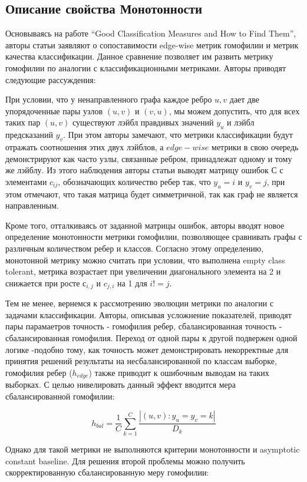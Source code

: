 \documentclass[a4paper,14pt]{article}
\begin{document}
	
	\subsection{Описание свойства Монотонности}
	
	Основываясь на работе “Good Classification Measures and How to Find Them”, авторы статьи заявляют о сопоставимости edge-wise метрик гомофилии и метрик качества классификации.
	Данное сравнение позволяет им развить метрику гомофилии по аналогии с классификационными метриками. Авторы приводят следующие рассуждения:
	
	При условии, что у ненаправленного графа каждое ребро ${u, v}$ дает две упорядоченные пары узлов $(u, v)$ и $(v, u)$, мы можем допустить, что для всех таких пар $(u, v)$ существуют лэйбл правдивых значений $y_u$ и лэйбл предсказаний $y_v$.
	При этом авторы замечают, что метрики классификации будут отражать соотношения этих двух лэйблов, а $edge-wise$ метрики в свою очередь демонстрируют как часто узлы, связанные ребром, принадлежат одному и тому же лэйблу.
	Из этого наблюдения авторы статьи выводят матрицу ошибок С с элементами $c_{ij}$, обозначающих количество ребер так, что $y_u = i$ и $y_v = j$, при этом отмечают, что такая матрица будет симметричной, так как граф не является направленным.
	
	Кроме того, отталкиваясь от заданной матрицы ошибок, авторы вводят новое определение монотонности метрики гомофилии, позволяющее сравнивать графы с различным количеством ребер и классов.
	Согласно этому определению, монотонной метрику можно считать при условии, что выполнена empty class tolerant, метрика возрастает при увеличении диагонального элемента на 2 и снижается при росте $с_{i,j}$ и $c_{j,i}$  на 1 для $i!=j$.
	
	Тем не менее, вернемся к рассмотрению эволюции метрики по аналогии с задачами классификации.
	Авторы, описывая усложнение показателей, приводят пары парамаетров точность - гомофилия ребер, сбалансированная точность - сбалансированная гомофилия.
	Переход от одной пары к другой подвержен одной логике -подобно тому, как точность может демонстрировать некорректные для принятия решений результаты на несбалансированной по классам выборке, гомофилия ребер ($h_{edge}$) также приводит к ошибочным выводам на таких выборках.
	С целью нивелировать данный эффект вводится мера сбалансированной гомофилии:
	
	$$h_{bal} = \dfrac{1}{C}\sum_{k=1}^{C}\dfrac{|(u,v) : y_u = y_v = k|}{D_k}$$
	
	Однако для такой метрики не выполняются критерии монотонности и asymptotic constant baseline.
	Для решения второй проблемы можно получить скорректированную сбалансированную меру гомофилии:
	
\end{document}

